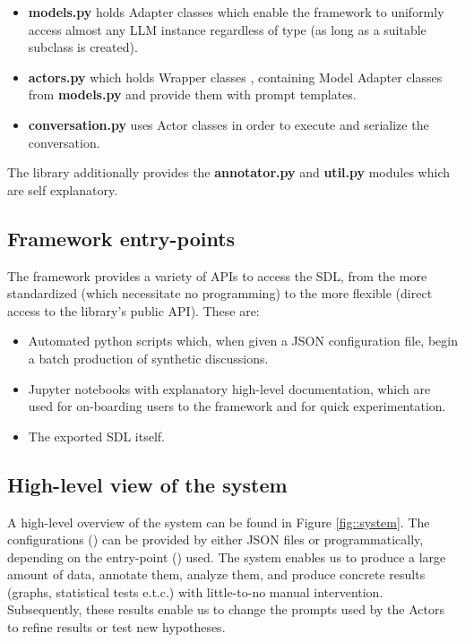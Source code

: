 \begin{itemize}
	\item \textbf{models.py} holds Adapter classes \cite{gamma1995design} which enable the framework to uniformly access almost any LLM instance regardless of type (as long as a suitable subclass is created).
	
	\item \textbf{actors.py} which holds Wrapper classes \cite{gamma1995design}, containing Model Adapter classes from \textbf{models.py} and provide them with prompt templates.
	
	\item \textbf{conversation.py} uses Actor classes in order to execute and serialize the conversation.
\end{itemize}

The library additionally provides the \textbf{annotator.py} and \textbf{util.py} modules which are self explanatory.


\subsection{Framework entry-points}
\label{ssec:system:entrypoints}

The framework provides a variety of APIs to access the SDL, from the more standardized (which necessitate no programming) to the more flexible (direct access to the library's public API). These are:

\begin{itemize}
	\item Automated python scripts which, when given a JSON configuration file, begin a batch production of synthetic discussions.
	
	\item Jupyter notebooks with explanatory high-level documentation, which are used for on-boarding users to the framework and for quick experimentation.
	
	\item The exported SDL itself.
\end{itemize}


\subsection{High-level view of the system}
\label{ssec:system:overview}

A high-level overview of the system can be found in Figure \ref{fig::system}. The configurations () can be provided by either JSON files or programmatically, depending on the entry-point () used. The system enables us to produce a large amount of data, annotate them, analyze them, and produce concrete results (graphs, statistical tests e.t.c.) with little-to-no manual intervention. Subsequently, these results enable us to change the prompts used by the Actors to refine results or test new hypotheses.

